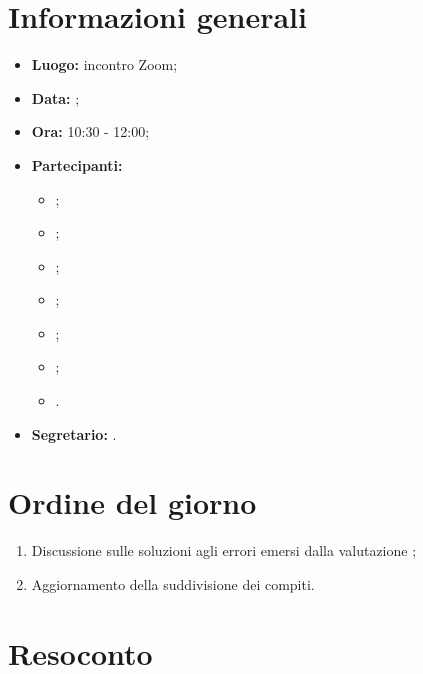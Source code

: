 \section{Informazioni generali}
\begin{itemize}
	\item \textbf{Luogo:} incontro Zoom;
	\item \textbf{Data:} \Data;
	\item \textbf{Ora:} 10:30 - 12:00;
	\item \textbf{Partecipanti:}
	\begin{itemize}
		\item \BL{}; 
		\item \FF{};
		\item \MM{}; 
		\item \PC{};
		\item \TG{};
		\item \TL{};
		\item \VD{}.
	\end{itemize} 
	\item \textbf{Segretario:} \FF{}.
\end{itemize}

\section{Ordine del giorno}
\begin{enumerate}
	\item Discussione sulle soluzioni agli errori emersi dalla valutazione ;
	\item Aggiornamento della suddivisione dei compiti.
\end{enumerate}

\section{Resoconto}
